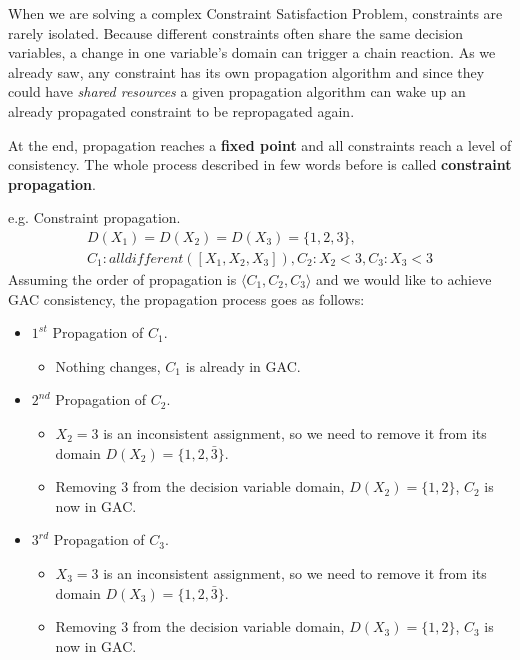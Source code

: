 When we are solving a complex Constraint Satisfaction Problem, constraints are rarely isolated. Because different constraints often share the same decision variables,
a change in one variable's domain can trigger a chain reaction. As we already saw, any constraint has its own propagation algorithm and since they could have 
\textit{shared resources} a given propagation algorithm can wake up an already propagated constraint to be repropagated again. \vspace{7pt}

At the end, propagation reaches a \textbf{fixed point} and all constraints reach a level of consistency. The whole process described in few words before is called
\textbf{constraint propagation}.
\begin{example}
    e.g. Constraint propagation.
    $$
        \begin{gathered}
            D(X_1) = D(X_2) = D(X_3) = \{1, 2, 3\}, \\
            C_1: \textit{alldifferent}([X_1, X_2, X_3]), C_2: X_2 < 3, C_3: X_3 < 3
        \end{gathered}
    $$
    Assuming the order of propagation is $\langle C_1, C_2, C_3 \rangle$ and we would like to achieve GAC consistency, the propagation process goes as 
    follows:
    \begin{itemize}
        \renewcommand{\labelitemi}{}
        \item $1^{st}$ Propagation of $C_1$. 
        \begin{itemize}
            \item Nothing changes, $C_1$ is already in GAC. 
        \end{itemize}
        \item $2^{nd}$ Propagation of $C_2$. 
        \begin{itemize}
            \item $X_2 = 3$ is an inconsistent assignment, so we need to remove it from its domain $D(X_2) = \{1, 2, \bar{3}\}$.
            \item Removing $3$ from the decision variable domain, $D(X_2) = \{1, 2\}$, $C_2$ is now in GAC.
        \end{itemize}
        \item $3^{rd}$ Propagation of $C_3$.
        \begin{itemize}
            \item $X_3 = 3$ is an inconsistent assignment, so we need to remove it from its domain $D(X_3) = \{1, 2, \bar{3}\}$.
            \item Removing $3$ from the decision variable domain, $D(X_3) = \{1, 2\}$, $C_3$ is now in GAC.

\end{itemize}
\end{itemize}
\end{example}
